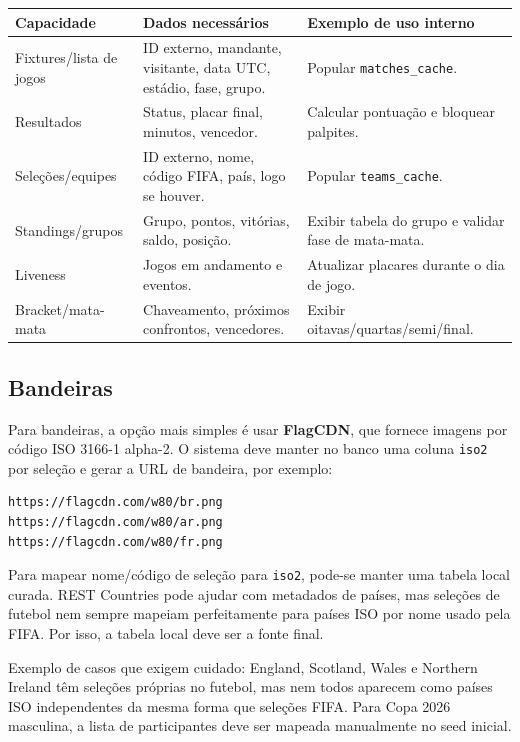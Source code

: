 \documentclass[12pt,a4paper]{article}
\begin{document}
\begin{longtable}{p{}p{}p{}}
\toprule
\textbf{Capacidade} & \textbf{Dados necessários} & \textbf{Exemplo de uso interno} \\
\midrule
Fixtures/lista de jogos & ID externo, mandante, visitante, data UTC, estádio, fase, grupo. & Popular \texttt{matches\_cache}. \\
Resultados & Status, placar final, minutos, vencedor. & Calcular pontuação e bloquear palpites. \\
Seleções/equipes & ID externo, nome, código FIFA, país, logo se houver. & Popular \texttt{teams\_cache}. \\
Standings/grupos & Grupo, pontos, vitórias, saldo, posição. & Exibir tabela do grupo e validar fase de mata-mata. \\
Liveness & Jogos em andamento e eventos. & Atualizar placares durante o dia de jogo. \\
Bracket/mata-mata & Chaveamento, próximos confrontos, vencedores. & Exibir oitavas/quartas/semi/final. \\
\bottomrule
\end{longtable}

\subsection{Bandeiras}

Para bandeiras, a opção mais simples é usar \textbf{FlagCDN}, que fornece imagens por código ISO 3166-1 alpha-2. O sistema deve manter no banco uma coluna \texttt{iso2} por seleção e gerar a URL de bandeira, por exemplo:

\begin{lstlisting}[language={},caption={Exemplo de URL de bandeira}]
https://flagcdn.com/w80/br.png
https://flagcdn.com/w80/ar.png
https://flagcdn.com/w80/fr.png
\end{lstlisting}

Para mapear nome/código de seleção para \texttt{iso2}, pode-se manter uma tabela local curada. REST Countries pode ajudar com metadados de países, mas seleções de futebol nem sempre mapeiam perfeitamente para países ISO por nome usado pela FIFA. Por isso, a tabela local deve ser a fonte final.

\begin{notebox}
Exemplo de casos que exigem cuidado: England, Scotland, Wales e Northern Ireland têm seleções próprias no futebol, mas nem todos aparecem como países ISO independentes da mesma forma que seleções FIFA. Para Copa 2026 masculina, a lista de participantes deve ser mapeada manualmente no seed inicial.
\end{notebox}
\end{document}

